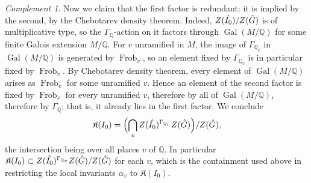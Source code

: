 \documentclass[11pt,a4paper]{article}
\theoremstyle{definition}
\theoremstyle{plain}
\theoremstyle{remark}
\newtheorem{Rc}[shared]{Complement}
\theoremstyle{plain}
\DeclareMathOperator{\Frob}{Frob}
\DeclareMathOperator{\Gal}{Gal}
\begin{document}
\begin{Rc}
    Now we claim that the first factor is redundant: it is implied by the second, by the Chebotarev density theorem. Indeed, $Z(\Hat{I_0})/Z(\Hat{G})$ is of multiplicative type, so the $\Gamma_{\mathbb{Q}}$-action on it factors through $\Gal(M/\mathbb{Q})$ for some finite Galois extension $M/\mathbb{Q}$. For $v$ unramified in $M$, the image of $\Gamma_{\mathbb{Q}_v}$ in $\Gal(M/\mathbb{Q})$ is generated by $\Frob_v$, so an element fixed by $\Gamma_{\mathbb{Q}_v}$ is in particular fixed by $\Frob_v$. By Chebotarev density theorem, every element of $\Gal(M/\mathbb{Q})$ arises as $\Frob_v$ for some unramified $v$. Hence an element of the second factor is fixed by $\Frob_v$ for every unramified $v$, therefore by all of $\Gal(M/\mathbb{Q})$, therefore by $\Gamma_{\mathbb{Q}}$; that is, it already lies in the first factor. We conclude
    $$\mathfrak{K}(I_0) = \Bigl( \bigcap_v Z(\Hat{I_0})^{\Gamma_{\mathbb{Q}_v}} Z(\Hat{G}) \Bigr)/Z(\Hat{G}),$$
    the intersection being over all places $v$ of $\mathbb{Q}$. In particular $\mathfrak{K}(I_0) \subset Z(\Hat{I_0})^{\Gamma_{\mathbb{Q}_v}}Z(\Hat{G})/Z(\Hat{G})$ for each $v$, which is the containment used above in restricting the local invariants $\alpha_v$ to $\mathfrak{K}(I_0)$.
\end{Rc}
\end{document}
